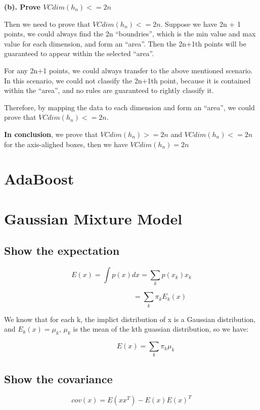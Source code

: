 \documentclass{article} %
\begin{document}
\textbf{(b). Prove $VCdim(h_n) <= 2n$}

Then we need to prove that $VCdim(h_n) <= 2n$. Suppose we have 2n + 1 points, we
could always find the 2n ``boundries'', which is the min value and max value for
each dimension, and form an ``area''. Then the 2n+1th points will be guaranteed to
appear within the selected ``area''.

For any 2n+1 points, we could always transfer to the above mentioned scenario. In
this scenario, we could not classify the 2n+1th point, because it is contained
within the ``area'', and no rules are guaranteed to rightly classify it.

Therefore, by mapping the data to each dimension and form an ``area'', we could
prove that $VCdim(h_n) <= 2n$.

\textbf{In conclusion}, we prove that $VCdim(h_n) >= 2n$ and $VCdim(h_n) <= 2n$ for the
axis-alighed boxes, then we have $VCdim(h_n) = 2n$



\section{AdaBoost}



\section{Gaussian Mixture Model}


\subsection{Show the expectation}
\begin{equation}
E (x) = \int p(x) dx = \sum_k p(x_k) x_k
\end{equation}

\begin{equation}
\qquad \qquad \qquad \qquad
= \sum_k \pi_k E_k (x)
\end{equation}

We know that for each k, the implict distribution of x is a Gaussian
distribution, and $E_k (x) = \mu_k$, $\mu_k$ is the mean of the kth guassian
distribution, so we have:

\begin{equation}
\qquad \qquad
E (x) = \sum_k \pi_k \mu_k
\end{equation}


\subsection{Show the covariance}
\begin{equation}
cov (x) = E (x x^T) - E (x) E(x)^T
\end{equation}
\end{document}
